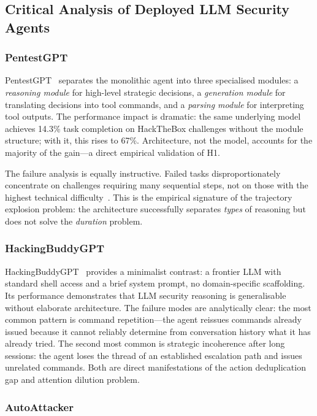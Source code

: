 \documentclass[12pt,a4paper,oneside,openany]{book}
\begin{document}
\subsection{Critical Analysis of Deployed LLM Security Agents}

\subsubsection{PentestGPT}

PentestGPT~\citep{deng2024pentestgpt} separates the monolithic agent into three specialised modules: a \textit{reasoning module} for high-level strategic decisions, a \textit{generation module} for translating decisions into tool commands, and a \textit{parsing module} for interpreting tool outputs. The performance impact is dramatic: the same underlying model achieves 14.3\% task completion on HackTheBox challenges without the module structure; with it, this rises to 67\%. Architecture, not the model, accounts for the majority of the gain---a direct empirical validation of H1.

The failure analysis is equally instructive. Failed tasks disproportionately concentrate on challenges requiring many sequential steps, not on those with the highest technical difficulty~\citep{deng2024pentestgpt}. This is the empirical signature of the trajectory explosion problem: the architecture successfully separates \textit{types} of reasoning but does not solve the \textit{duration} problem.

\subsubsection{HackingBuddyGPT}

HackingBuddyGPT~\citep{happe2023hackerllm} provides a minimalist contrast: a frontier LLM with standard shell access and a brief system prompt, no domain-specific scaffolding. Its performance demonstrates that LLM security reasoning is generalisable without elaborate architecture. The failure modes are analytically clear: the most common pattern is command repetition---the agent reissues commands already issued because it cannot reliably determine from conversation history what it has already tried. The second most common is strategic incoherence after long sessions: the agent loses the thread of an established escalation path and issues unrelated commands. Both are direct manifestations of the action deduplication gap and attention dilution problem.

\subsubsection{AutoAttacker}
\end{document}
